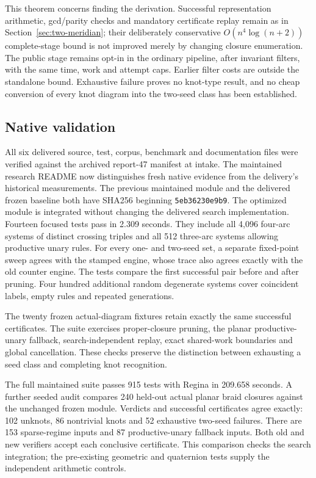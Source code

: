 This theorem concerns finding the derivation. Successful representation
arithmetic, gcd/parity checks and mandatory certificate replay remain as in
Section~\ref{sec:two-meridian}; their deliberately conservative
$O(n^4\log(n+2))$ complete-stage bound is not improved merely by changing
closure enumeration. The public stage remains opt-in in the ordinary
pipeline, after invariant filters, with the same time, work and attempt caps.
Earlier filter costs are outside the standalone bound. Exhaustive failure
proves no knot-type result, and no cheap conversion of every knot diagram
into the two-seed class has been established.

\subsection{Native validation}

All six delivered source, test, corpus, benchmark and documentation files
were verified against the archived report-47 manifest at intake. The maintained
research README now distinguishes fresh native evidence from the delivery's
historical measurements. The previous maintained module and the delivered frozen
baseline both have SHA256 beginning \texttt{5eb36230e9b9}. The optimized
module is integrated without changing the delivered search implementation.
Fourteen focused tests pass in 2.309 seconds. They include all 4,096
four-arc systems of distinct crossing triples and all 512 three-arc systems
allowing productive unary rules. For every one- and two-seed set, a separate
fixed-point sweep agrees with the stamped engine, whose trace also agrees
exactly with the old counter engine. The tests compare the first successful
pair before and after pruning. Four hundred additional random degenerate
systems cover coincident labels, empty rules and repeated generations.

The twenty frozen actual-diagram fixtures retain exactly the same successful
certificates. The suite exercises proper-closure pruning, the planar
productive-unary fallback, search-independent replay, exact shared-work
boundaries and global cancellation. These checks preserve the distinction
between exhausting a seed class and completing knot recognition.

The full maintained suite passes 915 tests with Regina in 209.658 seconds.
A further seeded audit compares 240 held-out actual planar braid closures
against the unchanged frozen module. Verdicts and successful certificates
agree exactly: 102 unknots, 86 nontrivial knots and 52 exhaustive two-seed
failures. There are 153 sparse-regime inputs and 87 productive-unary fallback
inputs. Both old and new verifiers accept each conclusive certificate.
This comparison checks the search integration; the pre-existing geometric
and quaternion tests supply the independent arithmetic controls.

